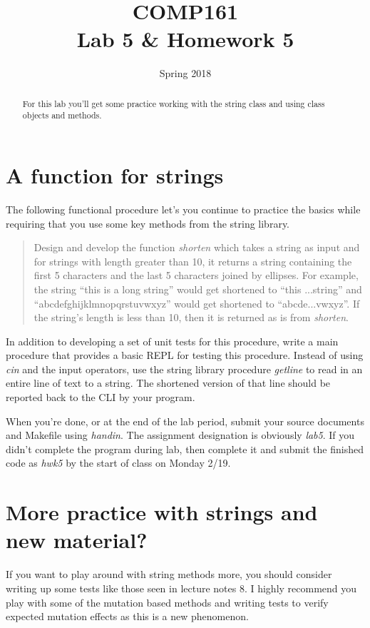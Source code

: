 \documentclass[nobib]{tufte-handout}
\title{COMP161 \\ Lab 5 \& Homework 5}
\author{}
\date{Spring 2018}
\begin{document}
\maketitle

\begin{abstract}
For this lab you'll get some practice working with the string class and using class objects and methods.
\end{abstract}

\section{ A function for strings }

The following functional procedure let's you continue to practice the basics while requiring that you use some key methods from the string library.
\begin{quote}
Design and develop the function \textit{shorten} which takes a string as input and for strings with length greater than 10, it returns a string containing the first 5 characters and the last 5 characters joined by ellipses. For example, the string ``this is a long string'' would get shortened to ``this ...string'' and ``abcdefghijklmnopqrstuvwxyz'' would get shortened to ``abcde...vwxyz''. If the string's length is less than 10, then it is returned as is from \textit{shorten}.
\end{quote}
In addition to developing a set of unit tests for this procedure, write a main procedure that provides a basic REPL for testing this procedure. Instead of using \textit{cin} and the input operators, use the string library procedure \textit{getline} to read in an entire line of text to a string. The shortened version of that line should be reported back to the CLI by your program.

When you're done, or at the end of the lab period, submit your source documents and Makefile using \textit{handin}. The assignment designation is obviously \textit{lab5}. If you didn't complete the program during lab, then complete it and submit the finished code as \textit{hwk5} by the start of class on Monday 2/19.

\section{ More practice with strings and new material? }

If you want to play around with string methods more, you should consider writing up some tests like those seen in lecture notes 8. I highly recommend you play with some of the mutation based methods and writing tests to verify expected mutation effects as this is a new phenomenon.
\end{document}
